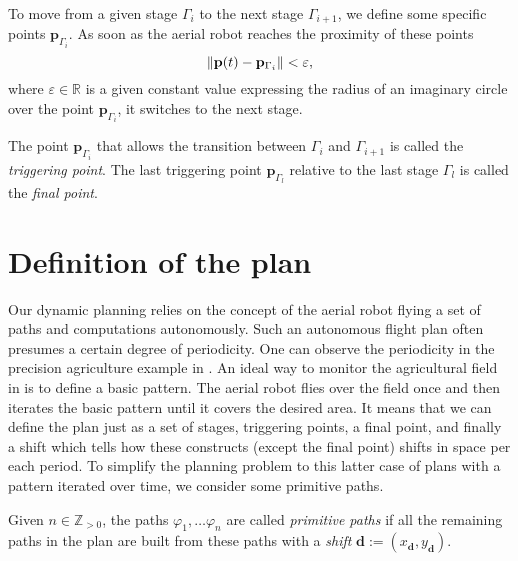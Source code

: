 To move from a given stage $\Gamma_i$ to the next stage $\Gamma_{i+1}$, we define some specific points $\mathbf{p}_{\Gamma_i}$. As soon as the aerial robot reaches the proximity of these points
\begin{equation}\label{eq:trig-vareps}
  \left\lVert\mathbf{p}(t)-\mathbf{p}_{\Gamma_i}\right\rVert<\varepsilon,
\end{equation}
where $\varepsilon\in\mathbb{R}$ is a given constant value expressing the radius of an imaginary circle over the point $\mathbf{p}_{\Gamma_i}$, it switches to the next stage.

\begin{highlight}  
  \begin{defn}\label{def:trigs}
    The point $\mathbf{p}_{\Gamma_{i}}$ that allows the transition between $\Gamma_i$ and $\Gamma_{i+1}$ is called the \emph{triggering point}. The last triggering point $\mathbf{p}_{\Gamma_{l}}$ relative to the last stage $\Gamma_l$ is called the \emph{final point}.
  \end{defn}
\end{highlight}


\section{Definition of the plan}
\label{sec:plan}

Our dynamic planning relies on the concept of the aerial robot flying a set of paths and computations autonomously. Such an autonomous flight plan often presumes a certain degree of periodicity. One can observe the periodicity in the precision agriculture example in . An ideal way to monitor the agricultural field in  is to define a basic pattern. The aerial robot flies over the field once and then iterates the basic pattern until it covers the desired area. It means that we can define the plan just as a set of stages, triggering points, a final point, and finally a shift which tells how these constructs (except the final point) shifts in space per each period. To simplify the planning problem to this latter case of plans with a pattern iterated over time, we consider some primitive paths.

\begin{highlight}
  \begin{defn}\label{def:primitive}
    Given $n\in\mathbb{Z}_{>0}$, the paths $\varphi_1,\dots\varphi_n$ are called \emph{primitive paths} if all the remaining paths in the plan are built from these paths with a \emph{shift} $\mathbf{d}:=(x_{\mathbf{d}},y_{\mathbf{d}})$. 
  \end{defn}
\end{highlight}

